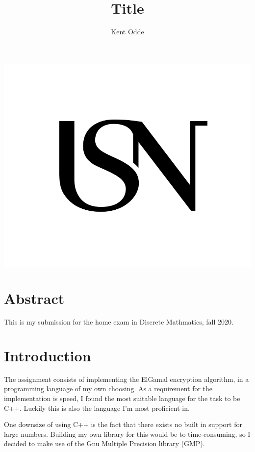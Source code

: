 \documentclass{article}
\begin{document}
\author{Kent Odde}
\title{Title}

\maketitle
\thispagestyle{empty}
\begin{center}
\includegraphics[width=\linewidth,height=0.2\textheight,keepaspectratio]{img/USN.png}
\end{center}
\newpage

\tableofcontents

\newpage

\section{Abstract}
This is my submission for the home exam in Discrete Mathmatics, fall 2020. 



\section{Introduction}
The assignment consists of implementing the ElGamal encryption algorithm, in a programming language of my own choosing. As a requirement for the implementation is speed, I found the most suitable language for the task to be C++. Luckily this is also the language I'm most proficient in. 

One downsize of using C++ is the fact that there exists no built in support for large numbers. Building my own library for this would be to time-consuming, so I decided to make use of the Gnu Multiple Precision library (GMP)\cite{GMP}.
\end{document}
